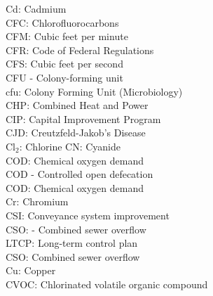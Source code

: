 Cd:  Cadmium
\vspace{0.3cm}\\
CFC:  Chlorofluorocarbons
\vspace{0.3cm}\\
CFM:  Cubic feet per minute
\vspace{0.3cm}\\
CFR:  Code of Federal Regulations
\vspace{0.3cm}\\
CFS:  Cubic feet per second
\vspace{0.3cm}\\
CFU - Colony-forming unit
\vspace{0.3cm}\\
cfu:  Colony Forming Unit (Microbiology)
\vspace{0.3cm}\\
CHP:  Combined Heat and Power
\vspace{0.3cm}\\
CIP:  Capital Improvement Program
\vspace{0.3cm}\\
CJD:  Creutzfeld-Jakob's Disease
\vspace{0.3cm}\\
Cl$_2$:  Chlorine
CN:  Cyanide
\vspace{0.3cm}\\
COD: Chemical oxygen demand
\vspace{0.3cm}\\
COD - Controlled open defecation
\vspace{0.3cm}\\
COD:  Chemical oxygen demand 
\vspace{0.3cm}\\
Cr: Chromium
\vspace{0.3cm}\\
CSI:  Conveyance system improvement
\vspace{0.3cm}\\
CSO: - Combined sewer overflow 
\vspace{0.3cm}\\
LTCP:  Long-term control plan
\vspace{0.3cm}\\
CSO:  Combined sewer overflow
\vspace{0.3cm}\\
Cu: Copper
\vspace{0.3cm}\\
CVOC:  Chlorinated volatile organic compound
\vspace{0.3cm}\\
